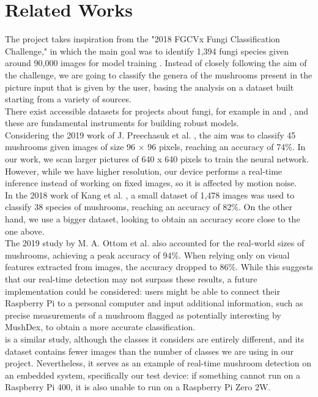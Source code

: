 \documentclass[conference]{IEEEtran}
\begin{document}
\section{Related Works}
The project takes inspiration from the "2018 FGCVx Fungi Classification Challenge," in which the main goal was to identify 1,394 fungi species given around 90,000 images for model training \cite{}. Instead of closely following the aim of the challenge, we are going to classify the genera of the mushrooms present in the picture input that is given by the user, basing the analysis on a dataset built starting from a variety of sources.\\
There exist accessible datasets for projects about fungi, for example in \cite{kaggle_mushroom_datasets} and \cite{roboflow_mushroom_datasets}, and these are fundamental instruments for building robust models.\\
Considering the 2019 work of J. Preechasuk et al. \cite{}, the aim was to classify 45 mushrooms given images of size 96 × 96 pixels, reaching an accuracy of 74\%. In our work, we scan larger pictures of 640 x 640 pixels to train the neural network. However, while we have higher resolution, our device performs a real-time inference instead of working on fixed images, so it is affected by motion noise.\\
In the 2018 work of Kang et al. \cite{}, a small dataset of 1,478 images was used to classify 38 species of mushrooms, reaching an accuracy of 82\%. On the other hand, we use a bigger dataset, looking to obtain an accuracy score close to the one above.\\
The 2019 study by M. A. Ottom et al. \cite{} also accounted for the real-world sizes of mushrooms, achieving a peak accuracy of 94\%. When relying only on visual features extracted from images, the accuracy dropped to 86\%. While this suggests that our real-time detection may not surpass these results, a future implementation could be considered: users might be able to connect their Raspberry Pi to a personal computer and input additional information, such as precise measurements of a mushroom flagged as potentially interesting by MushDex, to obtain a more accurate classification.\\
\cite{bouganssa2024recognition} is a similar study, although the classes it considers are entirely different, and its dataset contains fewer images than the number of classes we are using in our project. Nevertheless, it serves as an example of real-time mushroom detection on an embedded system, specifically our test device: if something cannot run on a Raspberry Pi 400, it is also unable to run on a Raspberry Pi Zero 2W.\\
\end{document}
